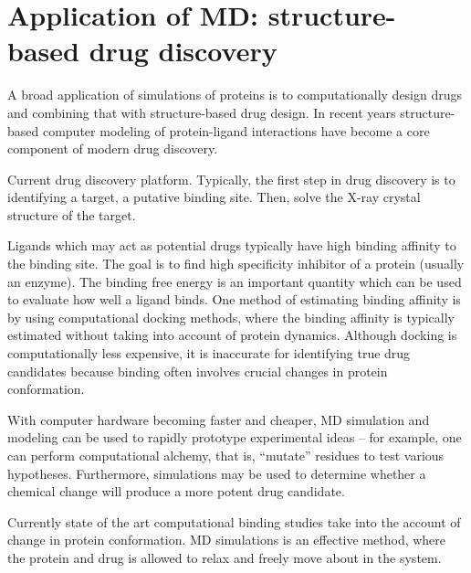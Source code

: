 \section{Application of MD: structure-based drug discovery}
\begin{outline}

	\1 A broad application of simulations of proteins is to computationally design drugs and combining that with structure-based drug design. In recent years structure-based computer modeling of protein-ligand interactions have become a core component of modern drug discovery. 

	\1 Current drug discovery platform. Typically, the first step in drug discovery is to identifying a target, a putative binding site.  Then, solve the X-ray crystal structure of the target.
	
	\1 Ligands which may act as potential drugs typically have high binding affinity to the binding site. The goal is to find high specificity inhibitor of a protein (usually an enzyme). The binding free energy is an important quantity which can be used to evaluate how well a ligand binds. One method of estimating binding affinity is by using computational docking methods, where the binding affinity is typically estimated without taking into account of protein dynamics.  Although docking is computationally less expensive, it is inaccurate for identifying true drug candidates because binding often involves crucial changes in protein conformation.

	\1 With computer hardware becoming faster and cheaper, MD simulation and modeling can be used to rapidly prototype experimental ideas -- for example, one can perform computational alchemy, that is, ``mutate'' residues to test various hypotheses. Furthermore, simulations may be used to determine whether a chemical change will produce a more potent drug candidate.
	
	\1 Currently state of the art computational binding studies take into the account of change in protein conformation. MD simulations is an effective method, where the protein and drug is allowed to relax and freely move about in the system.


\end{outline}
